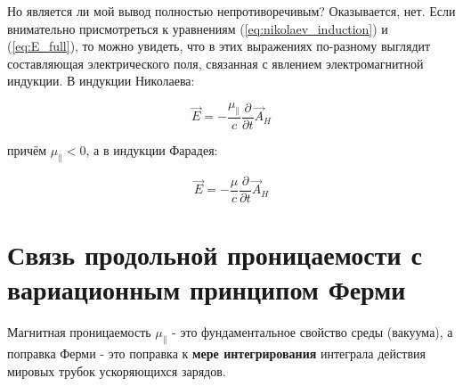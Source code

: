 \documentclass[12pt, a4paper]{article}
\begin{document}
Но является ли мой вывод полностью непротиворечивым? Оказывается, нет. Если внимательно присмотреться к уравнениям (\ref{eq:nikolaev_induction}) и (\ref{eq:E_full}), то можно увидеть, что в этих выражениях по-разному выглядит составляющая электрического поля, связанная с явлением электромагнитной индукции. В индукции Николаева:

\begin{equation}
\vec{E} = -\frac{\mu_{\parallel}}{c} \frac{\partial}{\partial t} \vec{A}_H
\label{eq:E_nikolaev}
\end{equation}

причём $\mu_{\parallel} < 0$, а в индукции Фарадея:

\begin{equation}
\vec{E} = -\frac{\mu}{c} \frac{\partial}{\partial t} \vec{A}_H
\label{eq:E_faraday}
\end{equation}

\section{Связь продольной проницаемости с вариационным принципом Ферми}
\label{sec:fermi_connection_corrected}




Магнитная проницаемость $\mu_{\parallel}$ - это фундаментальное свойство среды (вакуума), а поправка Ферми - это поправка к \textbf{мере интегрирования} интеграла действия мировых трубок ускоряющихся зарядов.%
\end{document}
